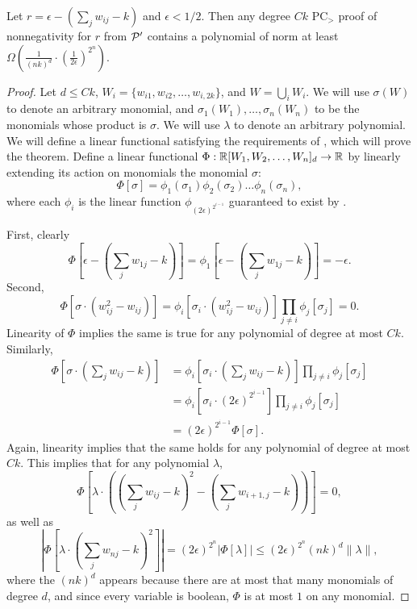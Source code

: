\begin{lemma}\label{lem:boolean-complex}
Let $r = \epsilon - \left(\sum_j w_{ij} - k\right)$ and $\epsilon < 1/2$. Then any degree $Ck$ PC$_>$ proof of nonnegativity for $r$ from $\mathcal P'$ contains a polynomial of norm at least $\Omega\left(\frac{1}{(nk)^d} \cdot \left(\frac{1}{2\epsilon}\right)^{2^n}\right)$.
\end{lemma}
\begin{proof}
Let $d \leq Ck$, $W_i = \{w_{i1}, w_{i2}, \dots, w_{i,2k}\}$, and $W = \bigcup_i W_i$. We will use $\sigma(W)$ to denote an arbitrary monomial, and $\sigma_1(W_1),\dots,\sigma_n(W_n)$ to be the monomials whose product is $\sigma$. We will use $\lambda$ to denote an arbitrary polynomial. We will define a linear functional satisfying the requirements of , which will prove the theorem. Define a linear functional $\Phi: \mathbb R[W_1,W_2,\dots,W_n]_d \rightarrow \mathbb R$ by linearly extending its action on monomials the monomial $\sigma$:
\[\Phi[\sigma] = \phi_1(\sigma_1)\phi_2(\sigma_2)\dots\phi_n(\sigma_n),\]
where each $\phi_i$ is the linear function $\phi_{(2\epsilon)^{2^{i-1}}}$ guaranteed to exist by .

First, clearly 
\[\Phi\left[\epsilon - \left(\sum_j w_{1j} - k\right)\right] = \phi_1\left[\epsilon - \left(\sum_j w_{1j} - k\right)\right] = -\epsilon.\]
Second, 
\[\Phi\left[\sigma\cdot(w_{ij}^2 - w_{ij})\right] = \phi_i\left[\sigma_i\cdot (w_{ij}^2 - w_{ij})\right]\prod_{j \neq i}\phi_j[\sigma_j] = 0.\] 
Linearity of $\Phi$ implies the same is true for any polynomial of degree at most $Ck$. Similarly, 
\begin{align*}
\Phi\left[\sigma\cdot\left(\sum_j w_{ij} - k\right)\right] &= \phi_i\left[\sigma_i \cdot \left(\sum_j w_{ij} - k\right)\right]\prod_{j \neq i}\phi_j[\sigma_j] \\
&= \phi_i\left[\sigma_i \cdot (2\epsilon)^{2^{i-1}}\right] \prod_{j \neq i}\phi_j[\sigma_j] \\
&= (2\epsilon)^{2^{i-1}} \Phi[\sigma].
\end{align*}
Again, linearity implies that the same holds for any polynomial of degree at most $Ck$. This implies that for any polynomial $\lambda$, 
\[\Phi\left[\lambda\cdot \left((\sum_{j} w_{ij} - k)^2 - (\sum_j w_{i+1,j} - k)\right)\right] = 0,\]
as well as
\[\left|\Phi\left[\lambda \cdot \left(\sum_j w_{nj} - k\right)^2\right]\right| = (2\epsilon)^{2^n}\left|\Phi[\lambda]\right| \leq (2\epsilon)^{2^n}(nk)^d\|\lambda\|,\]
where the $(nk)^d$ appears because there are at most that many monomials of degree $d$, and since every variable is boolean, $\Phi$ is at most $1$ on any monomial. 


\end{proof}

